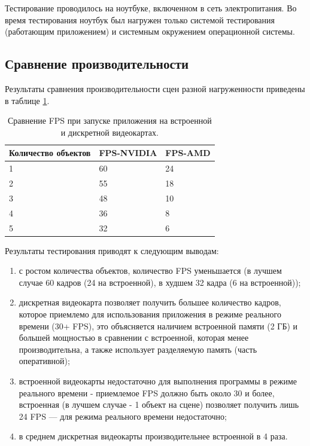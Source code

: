 Тестирование проводилось на ноутбуке, включенном в сеть электропитания. Во время тестирования ноутбук был нагружен только системой тестирования (работающим приложением) и системным окружением операционной системы.

\subsection{Сравнение производительности}

Результаты сравнения производительности сцен разной нагруженности приведены в таблице \ref{tb:comp_fps}.
\begin{table}[h]
	\caption{Сравнение FPS при запуске приложения на встроенной и дискретной видеокартах.}
	\begin{tabular}{|l|l|l|}
		\hline
		Количество объектов & FPS-NVIDIA & FPS-AMD \\
		\hline
		1                   & 60         & 24        \\
		2                   & 55         & 18        \\
		3                   & 48         & 10        \\
		4                   & 36         & 8        \\
		5                   & 32         & 6         \\
		\hline
	\end{tabular}
	\label{tb:comp_fps}
\end{table}

\clearpage

Результаты тестирования приводят к следующим выводам:
\begin{enumerate}[label=\arabic*)]
	\item с ростом количества объектов, количество FPS уменьшается (в лучшем случае 60 кадров (24 на встроенной), в худшем 32 кадра (6 на встроенной));
	\item дискретная видеокарта позволяет получить большее количество кадров, которое приемлемо для использования приложения в режиме реального времени (30+ FPS),
	это объясняется наличием встроенной памяти (2 ГБ) и большей мощностью в сравнении с встроенной, которая менее производительна, а также использует разделяемую память (часть оперативной);
	\item встроенной видеокарты недостаточно для выполнения программы в режиме реального времени - приемлемое FPS должно быть около 30 и более, встроенная 
	(в лучшем случае - 1 объект на сцене) позволяет получить лишь 24 FPS ---  для режима реального времени недостаточно;
	\item в среднем дискретная видеокарты производительнее встроенной в 4 раза.
\end{enumerate}



